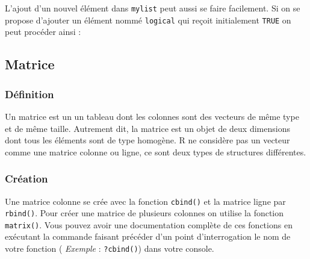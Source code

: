 \documentclass[
]{book}
\newenvironment{Shaded}{\begin{snugshade}}{\end{snugshade}}
\newcommand{\CommentTok}[1]{\textcolor[rgb]{0.56,0.35,0.01}{\textit{#1}}}
\newcommand{\ConstantTok}[1]{\textcolor[rgb]{0.00,0.00,0.00}{#1}}
\newcommand{\NormalTok}[1]{#1}
\newcommand{\OtherTok}[1]{\textcolor[rgb]{0.56,0.35,0.01}{#1}}
\newcommand{\SpecialCharTok}[1]{\textcolor[rgb]{0.00,0.00,0.00}{#1}}
\theoremstyle{definition}
\theoremstyle{definition}
\theoremstyle{definition}
\theoremstyle{definition}
\theoremstyle{remark}
\begin{document}
L'ajout d'un nouvel élément dans \texttt{mylist} peut aussi se faire facilement. Si on se propose d'ajouter un élément nommé \texttt{logical} qui reçoit initialement \texttt{TRUE} on peut procéder ainsi :

\begin{Shaded}
\end{Shaded}

\hypertarget{matrice}{%
\subsection{Matrice}\label{matrice}}

\hypertarget{duxe9finition-3}{%
\subsubsection*{Définition}\label{duxe9finition-3}}

Un matrice est un un tableau dont les colonnes sont des vecteurs de même type et de même taille. Autrement dit, la matrice est un objet de deux dimensions dont tous les éléments sont de type homogène. R ne considère pas un vecteur comme une matrice colonne ou ligne, ce sont deux types de structures différentes.

\hypertarget{cruxe9ation-3}{%
\subsubsection*{Création}\label{cruxe9ation-3}}

Une matrice colonne se crée avec la fonction \texttt{cbind()} et la matrice ligne par \texttt{rbind()}. Pour créer une matrice de plusieurs colonnes on utilise la fonction \texttt{matrix()}.
Vous pouvez avoir une documentation complète de ces fonctions en exécutant la commande faisant précéder d'un point d'interrogation le nom de votre fonction ( \emph{Exemple} : \texttt{?cbind()}) dans votre console.
\end{document}
